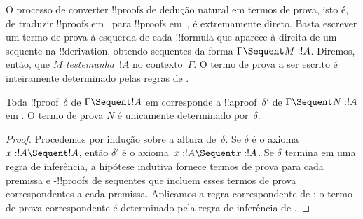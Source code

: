 \documentclass[../../../include/open-logic-section]{subfiles}
\begin{document}


O processo de converter !!{proof}s de dedução natural em termos de prova,
isto é, de traduzir !!{proof}s em~ para !!{proof}s em~,
é extremamente direto. Basta escrever um termo de prova à esquerda de
cada !!{formula} que aparece à direita de um sequente na !!{derivation},
obtendo sequentes da forma $\Gamma \Sequent M : !A$. Diremos, então, que
$M$ \emph{testemunha}~$!A$ no contexto~$\Gamma$. O termo de prova a ser
escrito é inteiramente determinado pelas regras de .

\begin{prop}
Toda !!{proof}~$\delta$ de $\Gamma \Sequent !A$ em 
corresponde a !!a{proof}~$\delta'$ de $\Gamma \Sequent N : !A$ em
. O termo de prova $N$ é unicamente determinado por~$\delta$.
\end{prop}

\begin{proof}
Procedemos por indução sobre a altura de~$\delta$. Se $\delta$ é o axioma
$x:!A \Sequent !A$, então $\delta'$ é o axioma~$x:!A \Sequent x:!A$. Se
$\delta$ termina em uma regra de inferência, a hipótese indutiva fornece
termos de prova para cada premissa e -!!{proof}s de sequentes
que incluem esses termos de prova correspondentes a cada premissa.
Aplicamos a regra correspondente de ; o termo de prova
correspondente é determinado pela regra de inferência de .
\end{proof}
\end{document}
